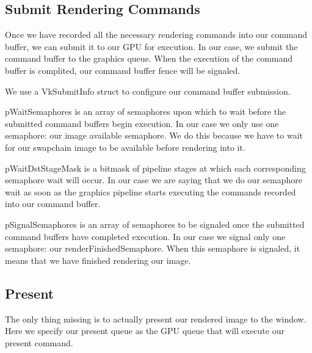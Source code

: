 \subsection{Submit Rendering Commands}

Once we have recorded all the necessary rendering commands into our command
buffer, we can submit it to our GPU for execution.
In our case, we submit the command buffer to the graphics queue.
When the execution of the command buffer is complited, our command buffer fence
will be signaled.

\begin{minipage}{\linewidth}{\noindent}
    
\end{minipage}

We use a VkSubmitInfo struct to configure our command buffer submission.

pWaitSemaphores is an array of semaphores upon which to wait before the submitted
command buffers begin execution.
In our case we only use one semaphore: our image available semaphore.
We do this because we have to wait for our swapchain image to be
available before rendering into it.

pWaitDstStageMask is a bitmask of pipeline stages at which each corresponding
semaphore wait will occur.
In our case we are saying that we do our semaphore wait as soon as the graphics
pipeline starts executing the commands recorded into our command buffer.

pSignalSemaphores is an array of semaphores to be signaled once the submitted command
buffers have completed execution.
In our case we signal only one semaphore: our renderFinishedSemaphore.
When this semaphore is signaled, it means that we have finished rendering our
image.

\begin{minipage}{\linewidth}{\noindent}
    
\end{minipage}

\subsection{Present}

The only thing missing is to actually present our rendered image to the window.
Here we specify our present queue as the GPU queue that will execute our present
command.

